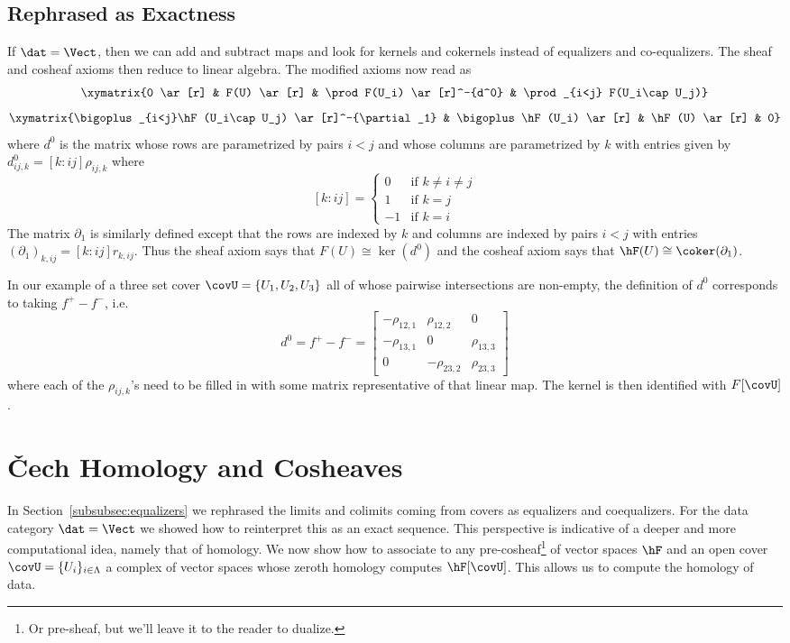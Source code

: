 \subsection{Rephrased as Exactness}\label{subsubsec:exactness}

If $\dat=\Vect$, then we can add and subtract maps and look for kernels and cokernels instead of equalizers and co-equalizers. The sheaf and cosheaf axioms then reduce to linear algebra. The modified axioms now read as
\[
	\xymatrix{0 \ar[r] & F(U) \ar[r] & \prod F(U_i) \ar[r]^-{d^0} & \prod_{i<j} F(U_i\cap U_j)}
\]
\[
	 \xymatrix{\bigoplus_{i<j}\hF(U_i\cap U_j) \ar[r]^-{\partial_1} & \bigoplus \hF(U_i) \ar[r] & \hF(U) \ar[r] & 0}
\]
where $d^0$ is the matrix whose rows are parametrized by pairs $i<j$ and whose columns are parametrized by $k$ with entries given by $d^0_{ij,k}=[k:ij]\rho_{ij,k}$ where 
	\[
		[k:ij]=\left\{\begin{array}{ll} 0 & \mathrm{if} \,\, k\neq i\neq j \\
		1 & \mathrm{if} \,\, k=j\\
		-1 & \mathrm{if} \,\, k=i\end{array}\right.
	\]
The matrix $\partial_1$ is similarly defined except that the rows are indexed by $k$ and columns are indexed by pairs $i<j$ with entries $(\partial_1)_{k,ij}=[k:ij]r_{k,ij}$. Thus the sheaf axiom says that $F(U)\cong \ker(d^0)$ and the cosheaf axiom says that $\hF(U)\cong \coker (\partial_1)$.
	
In our example of a three set cover $\covU=\{U_1,U_2,U_3\}$ all of whose pairwise intersections are non-empty, the definition of $d^0$ corresponds to taking $f^+ - f^-$, i.e.
	\[
		d^0=f^+ - f^- =\begin{bmatrix} -\rho_{12,1} & \rho_{12,2} & 0 \\ -\rho_{13,1} & 0 & \rho_{13,3} \\ 0 & -\rho_{23,2} & \rho_{23,3}\end{bmatrix}
	\]
where each of the $\rho_{ij,k}$'s need to be filled in with some matrix representative of that linear map. The kernel is then identified with $F[\covU]$.

\section{\v{C}ech Homology and Cosheaves}\label{subsec:cech}

In Section~\ref{subsubsec:equalizers} we rephrased the limits and colimits coming from covers as equalizers and coequalizers. For the data category $\dat=\Vect$ we showed how to reinterpret this as an exact sequence. This perspective is indicative of a deeper and more computational idea, namely that of homology. We now show how to associate to any pre-cosheaf\footnote{Or pre-sheaf, but we'll leave it to the reader to dualize.} of vector spaces $\hF$ and an open cover $\covU=\{U_i\}_{i\in\Lambda}$ a complex of vector spaces whose zeroth homology computes $\hF[\covU]$. This allows us to compute the homology of data.

